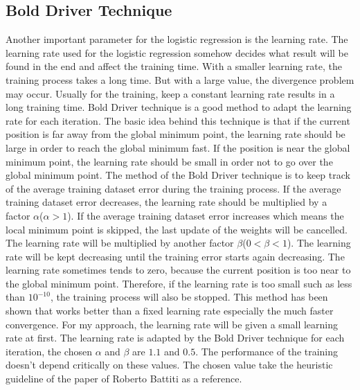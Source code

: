 \subsection{Bold Driver Technique}
Another important parameter for the logistic regression is the learning rate. The learning rate used  for the logistic regression somehow decides what result will be found in the end and affect the training time. With a smaller learning rate, the training process takes a long time. But with a large value, the divergence problem may occur. Usually for the training, keep a constant learning rate results in a long training time. Bold Driver technique is a good method to adapt the learning rate for each iteration. The basic idea behind this technique is that if the current position is far away from the global minimum point, the learning rate should be large in order to reach the global minimum fast. If the position is near the global minimum point, the learning rate should be small in order not to go over the global minimum point. The method of the Bold Driver technique is to keep track of the average training dataset error during the training process. If the average training dataset error decreases, the learning rate should be multiplied by a factor $\alpha$($\alpha>1$). If the average training dataset error increases which means the local minimum point is skipped, the last update of the weights will be cancelled. The learning rate will be multiplied by another factor $\beta$($0<\beta<1$). The learning rate will be kept decreasing until the training error starts again decreasing. The learning rate sometimes tends to zero, because the current position is too near to the global minimum point. Therefore, if the learning rate is too small such as less than $10^{-10}$, the training process will also be stopped. This method has been shown that works better than a fixed learning rate especially the much faster convergence. For my approach, the learning rate will be given a small learning rate at first. The learning rate is adapted by the Bold Driver technique for each iteration, the chosen $\alpha$ and $\beta$ are $1.1$ and $0.5$. The performance of the training doesn't depend critically on these values. The chosen value take the heuristic guideline of the paper of Roberto Battiti\cite{battiti1989accelerated} as a reference.  


